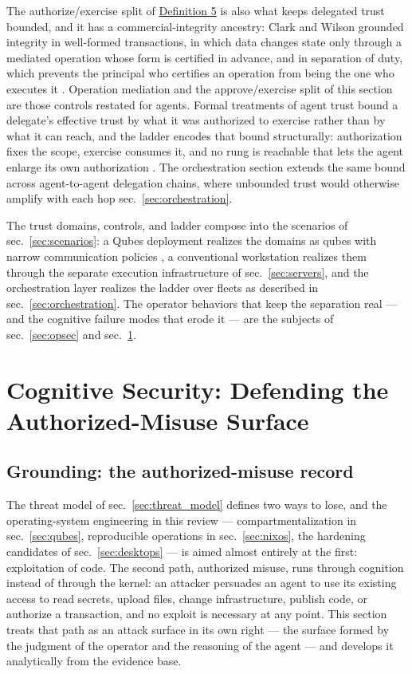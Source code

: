 \documentclass[
  english,
  9pt,
]{extarticle}
\begin{document}
The authorize/exercise split of
\hyperref[def:authority_ladder_order]{Definition 5} is also what keeps
delegated trust bounded, and it has a commercial-integrity ancestry:
Clark and Wilson grounded integrity in well-formed transactions, in
which data changes state only through a mediated operation whose form is
certified in advance, and in separation of duty, which prevents the
principal who certifies an operation from being the one who executes it
\citep{clark1987}. Operation mediation and the approve/exercise split of
this section are those controls restated for agents. Formal treatments
of agent trust bound a delegate's effective trust by what it was
authorized to exercise rather than by what it can reach, and the ladder
encodes that bound structurally: authorization fixes the scope, exercise
consumes it, and no rung is reachable that lets the agent enlarge its
own authorization \citep{cif_formal_2026}. The orchestration section
extends the same bound across agent-to-agent delegation chains, where
unbounded trust would otherwise amplify with each hop
sec.~\ref{sec:orchestration}.

The trust domains, controls, and ladder compose into the scenarios of
sec.~\ref{sec:scenarios}: a Qubes deployment realizes the domains as
qubes with narrow communication policies \citep{qubes_architecture}, a
conventional workstation realizes them through the separate execution
infrastructure of sec.~\ref{sec:servers}, and the orchestration layer
realizes the ladder over fleets as described in
sec.~\ref{sec:orchestration}. The operator behaviors that keep the
separation real --- and the cognitive failure modes that erode it ---
are the subjects of sec.~\ref{sec:opsec} and
sec.~\ref{sec:cognitive_security}.

\newpage

\section{Cognitive Security: Defending the Authorized-Misuse
Surface}\label{sec:cognitive_security}

\subsection{Grounding: the authorized-misuse
record}\label{grounding-the-authorized-misuse-record}

The threat model of sec.~\ref{sec:threat_model} defines two ways to
lose, and the operating-system engineering in this review ---
compartmentalization in sec.~\ref{sec:qubes}, reproducible operations in
sec.~\ref{sec:nixos}, the hardening candidates of
sec.~\ref{sec:desktops} --- is aimed almost entirely at the first:
exploitation of code. The second path, authorized misuse, runs through
cognition instead of through the kernel: an attacker persuades an agent
to use its existing access to read secrets, upload files, change
infrastructure, publish code, or authorize a transaction, and no exploit
is necessary at any point. This section treats that path as an attack
surface in its own right --- the surface formed by the judgment of the
operator and the reasoning of the agent --- and develops it analytically
from the evidence base.
\end{document}
